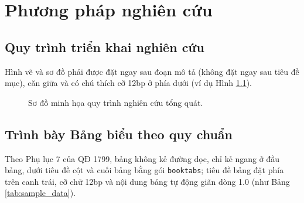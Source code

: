 
\chapter{Phương pháp nghiên cứu}\label{ch:phuong_phap}

\startcontents[chapters]

\section{Quy trình triển khai nghiên cứu}\label{sec:ch03_quy_trinh}

Hình vẽ và sơ đồ phải được đặt ngay sau đoạn mô tả (không đặt ngay sau tiêu đề mục), căn giữa và có chú thích cỡ 12bp ở phía dưới (ví dụ Hình \ref{fig:sample_pipeline}).

\begin{figure}[ht!]
  \centering
  \caption{Sơ đồ minh họa quy trình nghiên cứu tổng quát.}\label{fig:sample_pipeline}
\end{figure}

\section{Trình bày Bảng biểu theo quy chuẩn}\label{sec:ch03_bang}

Theo Phụ lục 7 của QĐ 1799, bảng không kẻ đường dọc, chỉ kẻ ngang ở đầu bảng, dưới tiêu đề cột và cuối bảng bằng gói \texttt{booktabs}; tiêu đề bảng đặt phía trên canh trái, cỡ chữ 12bp và nội dung bảng tự động giãn dòng 1.0 (như Bảng \ref{tab:sample_data}).

